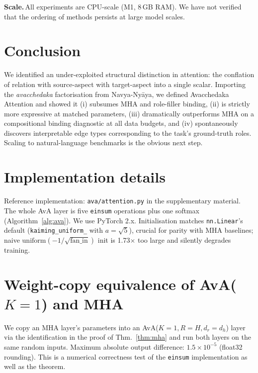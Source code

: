 \documentclass{article}
\begin{document}
\textbf{Scale.}\,All experiments are CPU-scale (M1, 8\,GB RAM). We
have not verified that the ordering of methods persists at large model
scales.

\section{Conclusion}

We identified an under-exploited structural distinction in attention:
the conflation of relation with source-aspect with target-aspect into
a single scalar. Importing the \emph{avacchedaka} factorisation from
Navya-Ny\=aya, we defined Avacchedaka Attention and showed it (i)
subsumes MHA and role-filler binding, (ii) is strictly more
expressive at matched parameters, (iii) dramatically outperforms MHA
on a compositional binding diagnostic at all data budgets, and (iv)
spontaneously discovers interpretable edge types corresponding to the
task's ground-truth roles. Scaling to natural-language benchmarks is
the obvious next step.




\appendix

\section{Implementation details}
\label{app:impl}

Reference implementation: \texttt{ava/attention.py} in the supplementary
material. The whole AvA layer is five \texttt{einsum} operations plus
one softmax (Algorithm~\ref{alg:ava}). We use PyTorch 2.x. Initialisation
matches \texttt{nn.Linear}'s default (\texttt{kaiming\_uniform\_} with
$a{=}\sqrt{5}$), crucial for parity with MHA baselines; naive
$\mathrm{uniform}(-1/\sqrt{\text{fan\_in}})$ init is 1.73$\times$ too
large and silently degrades training.

\section{Weight-copy equivalence of AvA($K{=}1$) and MHA}
\label{app:reduction-mha}

We copy an MHA layer's parameters into an AvA($K{=}1, R{=}H, d_r{=}d_h$)
layer via the identification in the proof of Thm.~\ref{thm:mha} and run
both layers on the same random inputs. Maximum absolute output
difference: $1.5 \times 10^{-5}$ (float32 rounding). This is a
numerical correctness test of the \texttt{einsum} implementation as
well as the theorem.
\end{document}
